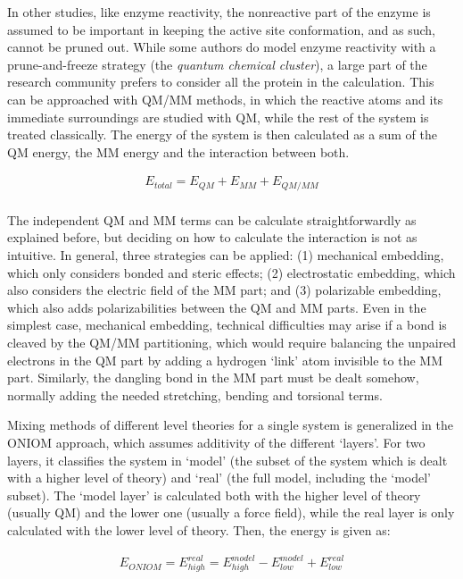 In other studies, like enzyme reactivity, the nonreactive part of the enzyme is assumed to be important in keeping the active site conformation, and as such, cannot be pruned out. While some authors do model enzyme reactivity with a prune-and-freeze strategy (the \textit{quantum chemical cluster}\cite{siegbahn2009recent}), a large part of the research community prefers to consider all the protein in the calculation.  This can be approached with QM/MM methods, in which the reactive atoms and its immediate surroundings are studied with QM, while the rest of the system is treated classically. The energy of the system is then calculated as a sum of the QM energy, the MM energy and the interaction between both.


\begin{align}
	E_{total}=E_{QM}+E_{MM}+E_{QM/MM} \\ \tag{QM/MM energy}
\end{align}


The independent QM and MM terms can be calculate straightforwardly as explained before, but deciding on how to calculate the interaction is not as intuitive. In general, three strategies can be applied: (1) mechanical embedding, which only considers bonded and steric effects; (2) electrostatic embedding, which also considers the electric field of the MM part; and (3) polarizable embedding, which also adds polarizabilities between the QM and MM parts. Even in the simplest case, mechanical embedding, technical difficulties may arise if a bond is cleaved by the QM/MM partitioning, which would require balancing the unpaired electrons in the QM part by adding a hydrogen ‘link’ atom invisible to the MM part. Similarly, the dangling bond in the MM part must be dealt somehow, normally adding the needed stretching, bending and torsional terms.

Mixing methods of different level theories for a single system is generalized in the ONIOM approach, which assumes additivity of the different ‘layers’. For two layers, it classifies the system in ‘model’ (the subset of the system which is dealt with a higher level of theory) and ‘real’ (the full model, including the ‘model’ subset). The ‘model layer’ is calculated both with the higher level of theory (usually QM) and the lower one (usually a force field), while the real layer is only calculated with the lower level of theory. Then, the energy is given as:

\begin{align}
  E_{ONIOM}=E_{high}^{real}=E_{high}^{model}-E_{low}^{model}+E_{low}^{real} \\ \tag{ONIOM energy}
\end{align}


